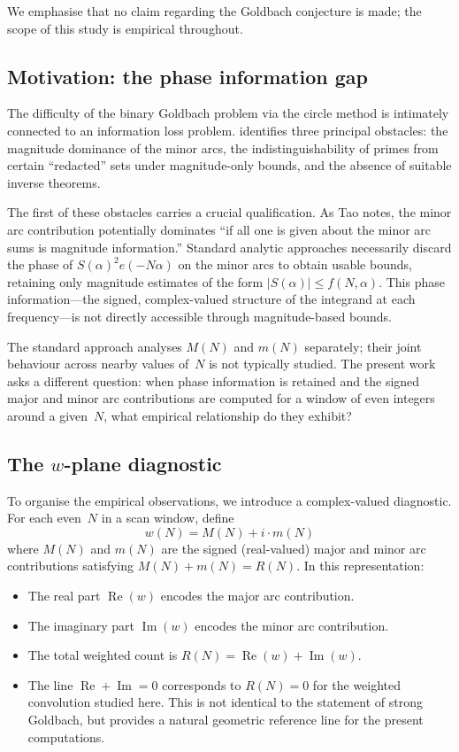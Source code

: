 \documentclass[11pt,a4paper]{article}
\newcommand{\RN}{R(N)}
\newcommand{\MN}{M(N)}
\newcommand{\mN}{m(N)}
\newcommand{\wN}{w(N)}
\begin{document}
We emphasise that no claim regarding the Goldbach conjecture is made; the scope of this study is empirical throughout.


\subsection{Motivation: the phase information gap}

The difficulty of the binary Goldbach problem via the circle method is intimately connected to an information loss problem. \citet{Tao2012} identifies three principal obstacles: the magnitude dominance of the minor arcs, the indistinguishability of primes from certain ``redacted'' sets under magnitude-only bounds, and the absence of suitable inverse theorems.

The first of these obstacles carries a crucial qualification. As Tao notes, the minor arc contribution potentially dominates ``if all one is given about the minor arc sums is magnitude information.'' Standard analytic approaches necessarily discard the phase of $S(\alpha)^2 e(-N\alpha)$ on the minor arcs to obtain usable bounds, retaining only magnitude estimates of the form $|S(\alpha)| \leq f(N, \alpha)$. This phase information---the signed, complex-valued structure of the integrand at each frequency---is not directly accessible through magnitude-based bounds.

The standard approach analyses $\MN$ and $\mN$ separately; their joint behaviour across nearby values of~$N$ is not typically studied. The present work asks a different question: when phase information is retained and the signed major and minor arc contributions are computed for a window of even integers around a given~$N$, what empirical relationship do they exhibit?


\subsection{The $w$-plane diagnostic}

To organise the empirical observations, we introduce a complex-valued diagnostic. For each even~$N$ in a scan window, define
\begin{equation}\label{eq:wplane}
\wN = \MN + i \cdot \mN
\end{equation}
where $\MN$ and $\mN$ are the signed (real-valued) major and minor arc contributions satisfying $\MN + \mN = \RN$. In this representation:
\begin{itemize}
\item The real part $\operatorname{Re}(w)$ encodes the major arc contribution.
\item The imaginary part $\operatorname{Im}(w)$ encodes the minor arc contribution.
\item The total weighted count is $\RN = \operatorname{Re}(w) + \operatorname{Im}(w)$.
\item The line $\operatorname{Re} + \operatorname{Im} = 0$ corresponds to $\RN = 0$ for the weighted convolution studied here. This is not identical to the statement of strong Goldbach, but provides a natural geometric reference line for the present computations.
\end{itemize}
\end{document}
